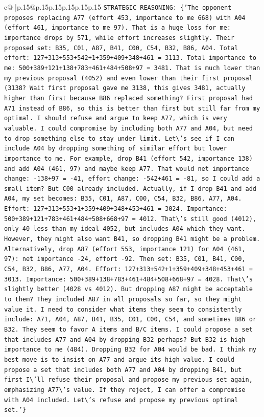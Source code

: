 \documentclass{article}
\begin{document}
{\begin{supertabular}{c@{$\;$}|p{.15\linewidth}@{}p{.15\linewidth}p{.15\linewidth}p{.15\linewidth}p{.15\linewidth}p{.15\linewidth}}
{{{                \texttt{STRATEGIC REASONING: \{'The opponent proposes replacing A77 (effort 453, importance to me 668) with A04 (effort 461, importance to me 97). That is a huge loss for me: importance drops by 571, while effort increases slightly. Their proposed set: B35, C01, A87, B41, C00, C54, B32, B86, A04. Total effort: 127+313+553+542+1+359+409+348+461 = 3113. Total importance to me: 500+389+121+138+783+461+484+508+97 = 3481. That is much lower than my previous proposal (4052) and even lower than their first proposal (3138? Wait first proposal gave me 3138, this gives 3481, actually higher than first because B86 replaced something? First proposal had A71 instead of B86, so this is better than first but still far from my optimal. I should refuse and argue to keep A77, which is very valuable. I could compromise by including both A77 and A04, but need to drop something else to stay under limit. Let\textbackslash{}'s see if I can include A04 by dropping something of similar effort but lower importance to me. For example, drop B41 (effort 542, importance 138) and add A04 (461, 97) and maybe keep A77. That would net importance change: {-}138+97 = {-}41, effort change: {-}542+461 = {-}81, so I could add a small item? But C00 already included. Actually, if I drop B41 and add A04, my set becomes: B35, C01, A87, C00, C54, B32, B86, A77, A04. Effort: 127+313+553+1+359+409+348+453+461 = 3024. Importance: 500+389+121+783+461+484+508+668+97 = 4012. That\textbackslash{}'s still good (4012), only 40 less than my ideal 4052, but includes A04 which they want. However, they might also want B41, so dropping B41 might be a problem. Alternatively, drop A87 (effort 553, importance 121) for A04 (461, 97): net importance {-}24, effort {-}92. Then set: B35, C01, B41, C00, C54, B32, B86, A77, A04. Effort: 127+313+542+1+359+409+348+453+461 = 3013. Importance: 500+389+138+783+461+484+508+668+97 = 4028. That\textbackslash{}'s slightly better (4028 vs 4012). But dropping A87 might be acceptable to them? They included A87 in all proposals so far, so they might value it. I need to consider what items they seem to consistently include: A71, A04, A87, B41, B35, C01, C00, C54, and sometimes B86 or B32. They seem to favor A items and B/C items. I could propose a set that includes A77 and A04 by dropping B32 perhaps? But B32 is high importance to me (484). Dropping B32 for A04 would be bad. I think my best move is to insist on A77 and argue its high value. I could propose a set that includes both A77 and A04 by dropping B41, but first I\textbackslash{}'ll refuse their proposal and propose my previous set again, emphasizing A77\textbackslash{}'s value. If they reject, I can offer a compromise with A04 included. Let\textbackslash{}'s refuse and propose my previous optimal set.'\}} \\
}}}
\end{supertabular}}
\end{document}
